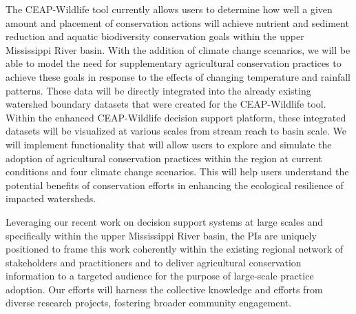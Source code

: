 \documentclass[12pt, class=article, crop=false]{standalone}
\begin{document}
The CEAP-Wildlife tool currently allows users to determine how well a given amount and placement of conservation actions will achieve nutrient and sediment reduction and aquatic biodiversity conservation goals within the upper Mississippi River basin.
With the addition of climate change scenarios, we will be able to model the need for supplementary agricultural conservation practices to achieve these goals in response to the effects of changing temperature and rainfall patterns.
These data will be directly integrated into the already existing watershed boundary datasets that were created for the CEAP-Wildlife tool.
Within the enhanced CEAP-Wildlife decision support platform, these integrated datasets will be visualized at various scales from stream reach to basin scale.
We will implement functionality that will allow users to explore and simulate the adoption of agricultural conservation practices within the region at current conditions and four climate change scenarios.
This will help users understand the potential benefits of conservation efforts in enhancing the ecological resilience of impacted watersheds.

Leveraging our recent work on decision support systems at large scales and specifically within the upper Mississippi River basin, the PIs are uniquely positioned to frame this work coherently within the existing regional network of stakeholders and practitioners and to deliver agricultural conservation information to a targeted audience for the purpose of large-scale practice adoption.
Our efforts will harness the collective knowledge and efforts from diverse research projects, fostering broader community engagement.


\end{document}
